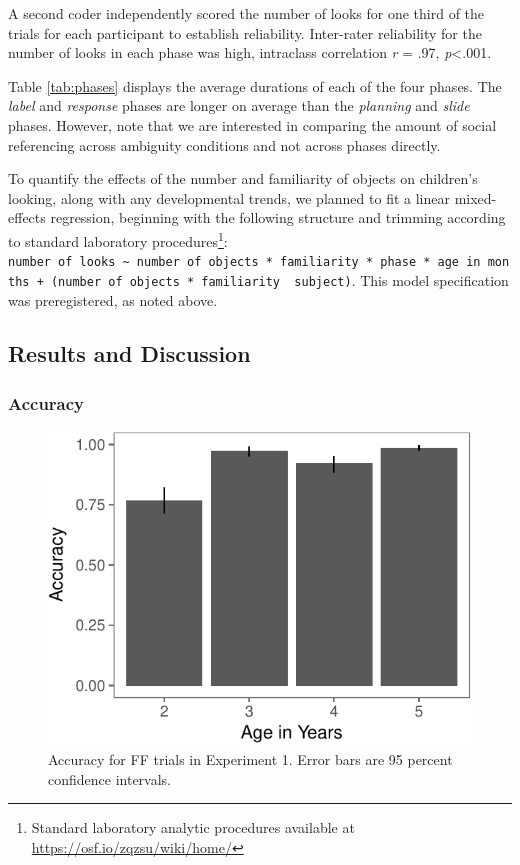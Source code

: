 \documentclass[a4paper,man,apacite,floatsintext]{apa6}
\newenvironment{CodeChunk}{}{}
\begin{document}
A second coder independently scored the number of looks for one third of
the trials for each participant to establish reliability. Inter-rater
reliability for the number of looks in each phase was high, intraclass
correlation \emph{r} = .97, \emph{p}\textless{}.001.

Table \ref{tab:phases} displays the average durations of each of the
four phases. The \emph{label} and \emph{response} phases are longer on
average than the \emph{planning} and \emph{slide} phases. However, note
that we are interested in comparing the amount of social referencing
across ambiguity conditions and not across phases directly.

To quantify the effects of the number and familiarity of objects on
children's looking, along with any developmental trends, we planned to
fit a linear mixed-effects regression, beginning with the following
structure and trimming according to standard laboratory
procedures\footnote{Standard laboratory analytic procedures available at
  \url{https://osf.io/zqzsu/wiki/home/}}:
\texttt{number\ of\ looks\ \textasciitilde{}\ number\ of\ objects\ *\ familiarity\ *\ phase\ *\ age\ in\ months\ +\ (number\ of\ objects\ *\ familiarity\ \textbar{}\ subject)}.
This model specification was preregistered, as noted above.

\subsection{Results and Discussion}\label{results-and-discussion}

\subsubsection{Accuracy}\label{accuracy}

\begin{CodeChunk}
\begin{figure}[b]

{\centering \includegraphics{figs/acc_e1-1} 

}

\caption[Accuracy for FF trials in Experiment 1]{Accuracy for FF trials in Experiment 1. Error bars are 95 percent confidence intervals.}\label{fig:acc_e1}
\end{figure}
\end{CodeChunk}
\end{document}
